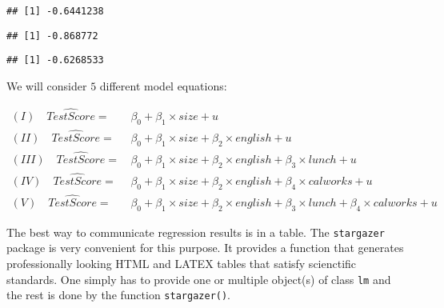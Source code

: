 \documentclass[]{book}
\newenvironment{Shaded}{\begin{snugshade}}{\end{snugshade}}
\newcommand{\KeywordTok}[1]{\textcolor[rgb]{0.13,0.29,0.53}{\textbf{#1}}}
\newcommand{\OperatorTok}[1]{\textcolor[rgb]{0.81,0.36,0.00}{\textbf{#1}}}
\newcommand{\NormalTok}[1]{#1}
\theoremstyle{definition}
\theoremstyle{definition}
\theoremstyle{definition}
\theoremstyle{remark}
\begin{document}
\begin{verbatim}
## [1] -0.6441238
\end{verbatim}

\begin{Shaded}
\end{Shaded}

\begin{verbatim}
## [1] -0.868772
\end{verbatim}

\begin{Shaded}
\end{Shaded}

\begin{verbatim}
## [1] -0.6268533
\end{verbatim}

We will consider \(5\) different model equations:

\begin{align*}
  (I) \quad \widehat{TestScore} =& \, \beta_0 + \beta_1 \times size + u \\
  (II) \quad \widehat{TestScore} =& \, \beta_0 + \beta_1 \times size + \beta_2 \times english + u \\
  (III) \quad \widehat{TestScore} =& \, \beta_0 + \beta_1 \times size + \beta_2 \times english + \beta_3 \times lunch + u \\
  (IV) \quad \widehat{TestScore} =& \, \beta_0 + \beta_1 \times size + \beta_2 \times english + \beta_4 \times calworks + u \\
  (V) \quad \widehat{TestScore} =& \, \beta_0 + \beta_1 \times size + \beta_2 \times english + \beta_3 \times lunch + \beta_4 \times calworks + u
\end{align*}

The best way to communicate regression results is in a table. The
\texttt{stargazer} package is very convenient for this purpose. It
provides a function that generates professionally looking HTML and LATEX
tables that satisfy scienctific standards. One simply has to provide one
or multiple object(s) of class \texttt{lm} and the rest is done by the
function \texttt{stargazer()}.
\end{document}
